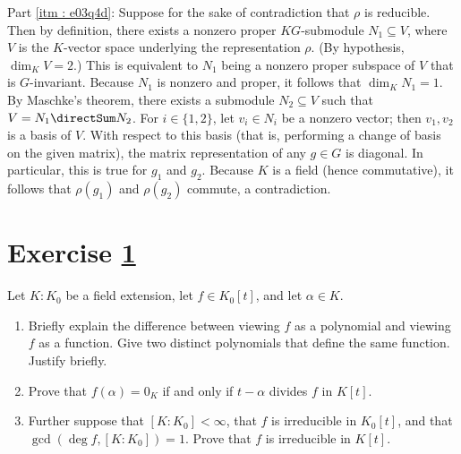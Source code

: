 {Part \ref{itm : e03q4d}: Suppose for the sake of contradiction that $\rho$ is reducible. Then by definition, there exists a nonzero proper $K G$-submodule $N_{1} \subseteq V$, where $V$ is the $K$-vector space underlying the representation $\rho$. (By hypothesis, $\dim_{K} V = 2$.) This is equivalent to $N_{1}$ being a nonzero proper subspace of $V$ that is $G$-invariant. Because $N_{1}$ is nonzero and proper, it follows that $\dim_{K} N_{1} = 1$. By Maschke's theorem, there exists a submodule $N_{2} \subseteq V$ such that $V = N_{1} \directSum N_{2}$. For $i \in \{1, 2\}$, let $v_{i} \in N_{i}$ be a nonzero vector; then $v_{1}, v_{2}$ is a basis of $V$. With respect to this basis (that is, performing a change of basis on the given matrix), the matrix representation of any $g \in G$ is diagonal. In particular, this is true for $g_{1}$ and $g_{2}$. Because $K$ is a field (hence commutative), it follows that $\rho(g_{1})$ and $\rho(g_{2})$ commute, a contradiction.}%



\section{Exercise \ref{sec : e03q5}}
\label{sec : e03q5}

\noindent{}Let $K : K_{0}$ be a field extension, let $f \in K_{0}[t]$, and let $\alpha \in K$.
\begin{enumerate}[label=(\alph*)]
\item\label{itm : e03q5a} Briefly explain the difference between viewing $f$ as a polynomial and viewing $f$ as a function. Give two distinct polynomials that define the same function. Justify briefly.
\item\label{itm : e03q5b} Prove that $f(\alpha) = 0_{K}$ if and only if $t - \alpha$ divides $f$ in $K[t]$.
\item\label{itm : e03q5c} Further suppose that $[K : K_{0}] < \infty$, that $f$ is irreducible in $K_{0}[t]$, and that $\gcd(\deg f, [K : K_{0}]) = 1$. Prove that $f$ is irreducible in $K[t]$.
\end{enumerate}


